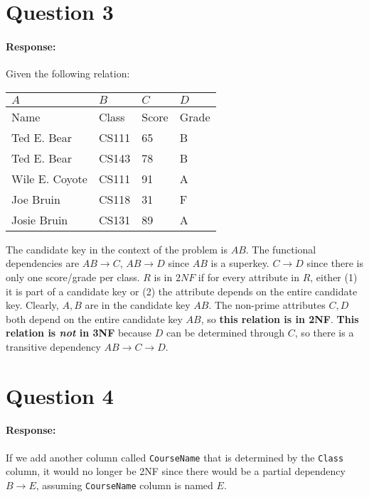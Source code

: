 \documentclass{report}
\renewcommand{\it}[1]{\textit{{#1}}}
\renewcommand{\bf}[1]{\textbf{{#1}}}
\renewcommand{\tt}[1]{\texttt{{#1}}}
\newcommand{\ib}[1]{\it{\bf{{#1}}}}
\newenvironment{response}{\begin{responseframe}\vspace{-10pt}\paragraph{Response:}}{\end{responseframe}}
\begin{document}
\newpage
\section*{Question 3}
\begin{response}
    Given the following relation:
    \begin{center}
        \begin{tabular}{l|l|l|l}
            $A$ & $B$ & $C$ & $D$ \\
            \hline
            Name & Class & Score & Grade \\
            \hline
            Ted E. Bear & CS111 & 65 & B \\
            Ted E. Bear & CS143 & 78 & B \\
            Wile E. Coyote & CS111 & 91 & A \\
            Joe Bruin & CS118 & 31 & F \\
            Josie Bruin & CS131 & 89 & A \\
        \end{tabular}
    \end{center}
    \noindent The candidate key in the context of the problem is $AB$. The functional dependencies 
    are
    \newline
    $AB \to C$, $AB \to D$ since $AB$ is a superkey.
    \newline
    $C \to D$ since there is only one score/grade per class.
    \newline
    $R$ is in $2NF$ if for every attribute in $R$, either (1) it is part of a candidate key or 
    (2) the attribute depends on the entire candidate key. Clearly, $A, B$ are in the candidate key 
    $AB$. The non-prime attributes $C, D$ both depend on the entire candidate key $AB$, so 
    \bf{this relation is in 2NF}.
    \newline
    \bf{This relation is \ib{not} in 3NF} because $D$ can be determined through $C$, so there is 
    a transitive dependency $AB \to C \to D$.
\end{response}

\newpage
\section*{Question 4}
\begin{response}
    If we add another column called \tt{CourseName} that is determined by the \tt{Class} column,
    it would no longer be 2NF since there would be a partial dependency $B \to E$, assuming
    \tt{CourseName} column is named $E$.
\end{response}
\end{document}

